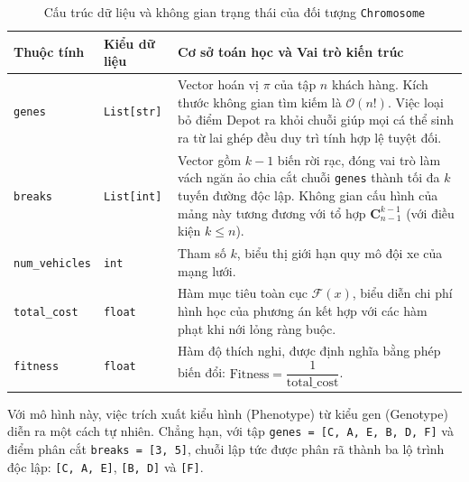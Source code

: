 \documentclass[12pt,a4paper]{article}
\numberwithin{figure}{subsection}
\numberwithin{table}{subsection}
\renewcommand{\le}{\leqslant}
\begin{document}
\begin{table}[htbp]
    \centering
    \caption{Cấu trúc dữ liệu và không gian trạng thái của đối tượng \texttt{Chromosome}}
    \label{tab:chromosome_attrs}
    \renewcommand{\arraystretch}{1.5}
    \begin{tabular}{|l|l|p{8.5cm}|}
        \hline
        \textbf{Thuộc tính} & \textbf{Kiểu dữ liệu} & \textbf{Cơ sở toán học và Vai trò kiến trúc} \\
        \hline
        \texttt{genes} & \texttt{List[str]} & Vector hoán vị $\pi$ của tập $n$ khách hàng. Kích thước không gian tìm kiếm là $\mathcal{O}(n!)$. Việc loại bỏ điểm Depot ra khỏi chuỗi giúp mọi cá thể sinh ra từ lai ghép đều duy trì tính hợp lệ tuyệt đối. \\
        \hline
        \texttt{breaks} & \texttt{List[int]} & Vector gồm $k-1$ biến rời rạc, đóng vai trò làm vách ngăn ảo chia cắt chuỗi \texttt{genes} thành tối đa $k$ tuyến đường độc lập. Không gian cấu hình của mảng này tương đương với tổ hợp $\mathbf{C}_{n-1}^{k-1}$ (với điều kiện $k \le n$). \\
        \hline
        \texttt{num\_vehicles} & \texttt{int} & Tham số $k$, biểu thị giới hạn quy mô đội xe của mạng lưới. \\
        \hline
        \texttt{total\_cost} & \texttt{float} & Hàm mục tiêu toàn cục $\mathcal{F}(x)$, biểu diễn chi phí hình học của phương án kết hợp với các hàm phạt khi nới lỏng ràng buộc. \\
        \hline
        \texttt{fitness} & \texttt{float} & Hàm độ thích nghi, được định nghĩa bằng phép biến đổi: $\text{Fitness} = \dfrac{1}{\text{total\_cost}}$. \\
        \hline
    \end{tabular}
\end{table}

Với mô hình này, việc trích xuất kiểu hình (Phenotype) từ kiểu gen (Genotype) diễn ra một cách tự nhiên. Chẳng hạn, với tập \texttt{genes = [C, A, E, B, D, F]} và điểm phân cắt \texttt{breaks = [3, 5]}, chuỗi lập tức được phân rã thành ba lộ trình độc lập: \texttt{[C, A, E]}, \texttt{[B, D]} và \texttt{[F]}. 
\end{document}
